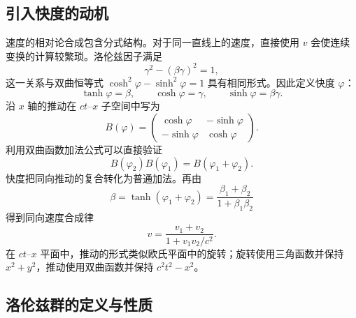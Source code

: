 \documentclass[style=classic,color=full]{lc-article}
\begin{document}
\subsection{引入快度的动机}

速度的相对论合成包含分式结构。对于同一直线上的速度，直接使用 $v$ 会使连续变换的计算较繁琐。洛伦兹因子满足
\begin{equation}
  \gamma^2-(\beta\gamma)^2=1,
\end{equation}
这一关系与双曲恒等式 $\cosh^2\varphi-\sinh^2\varphi=1$ 具有相同形式。因此定义快度 $\varphi$：
\begin{equation}
  \tanh\varphi=\beta,\qquad
  \cosh\varphi=\gamma,\qquad
  \sinh\varphi=\beta\gamma.
  \label{eq:rapiditydefinition}
\end{equation}
沿 $x$ 轴的推动在 $ct$--$x$ 子空间中写为
\begin{equation}
  B(\varphi)=
  \begin{pmatrix}
    \cosh\varphi&-\sinh\varphi\\
    -\sinh\varphi&\cosh\varphi
  \end{pmatrix}.
\end{equation}
利用双曲函数加法公式可以直接验证
\begin{equation}
  B(\varphi_2)B(\varphi_1)
  =B(\varphi_1+\varphi_2).
  \label{eq:rapidityaddition}
\end{equation}
快度把同向推动的复合转化为普通加法。再由
\begin{equation}
  \beta=\tanh(\varphi_1+\varphi_2)
  =\frac{\beta_1+\beta_2}{1+\beta_1\beta_2}
\end{equation}
得到同向速度合成律
\begin{equation}
  v=\frac{v_1+v_2}{1+v_1v_2/c^2}.
\end{equation}
在 $ct$--$x$ 平面中，推动的形式类似欧氏平面中的旋转；旋转使用三角函数并保持 $x^2+y^2$，推动使用双曲函数并保持 $c^2t^2-x^2$\cite{taylorwheeler,rindler}。

\subsection{洛伦兹群的定义与性质}
\end{document}
